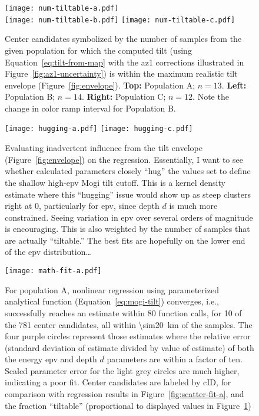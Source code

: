 \begin{figure}
    \begin{center}
     \texttt{[image: num-tiltable-a.pdf]}\\
     \texttt{[image: num-tiltable-b.pdf]}%
     \texttt{[image: num-tiltable-c.pdf]}
     \caption[Inflation center candidates by number of ``tiltable'' samples]{Center candidates symbolized by the number of samples from the given population for which the computed tilt (using Equation~\eqref{eq:tilt-from-map} with the \acs{az1} corrections illustrated in Figure~\ref{fig:az1-uncertainty}) is within the maximum realistic tilt envelope (Figure~\ref{fig:envelope}). \textbf{Top:} Population A; $n=13$. \textbf{Left:} Population B; $n=14$. \textbf{Right:} Population C; $n=12$. Note the change in color ramp interval for Population B.} 
     \label{fig:num-tiltable}
    \end{center}
\end{figure}

\begin{figure}
    \texttt{[image: hugging-a.pdf]}
    \texttt{[image: hugging-c.pdf]}
    \caption[Check for envelope ``hugging'']{Evaluating inadvertent influence from the tilt envelope (Figure~\ref{fig:envelope}) on the regression. Essentially, I want to see whether calculated parameters closely ``hug'' the values set to define the shallow high-\acs{epv} Mogi tilt cutoff. This is a kernel density estimate where this ``hugging'' issue would show up as steep clusters right at 0, particularly for \acs{epv}, since depth $d$ is much more constrained. Seeing variation in \acs{epv} over several orders of magnitude is encouraging. This is also weighted by the number of samples that are actually ``tiltable.'' The best fits are hopefully on the lower end of the \acs{epv} distribution\dots} 
    \label{fig:hugging}
\end{figure}

\begin{figure}
    \texttt{[image: math-fit-a.pdf]}%
    \caption[Population A: goodness of fit]{For population A, nonlinear regression using parameterized analytical function (Equation~\eqref{eq:mogi-tilt}) converges, i.e., successfully reaches an estimate within 80 function calls, for 10 of the 781 center candidates, all within \qty{\sim20}{\km} of the samples. The four purple circles represent those estimates where the relative error (standard deviation of estimate divided by value of estimate) of both the energy \acs{epv} and depth $d$ parameters are within a factor of ten. Scaled parameter error for the light grey circles are much higher, indicating a poor fit. Center candidates are labeled by cID, for comparison with regression results in Figure~\ref{fig:scatter-fit-a}, and the fraction ``tiltable'' (proportional to displayed values in Figure~\ref{fig:num-tiltable})}%
    \label{fig:math-fit-a}
\end{figure}

